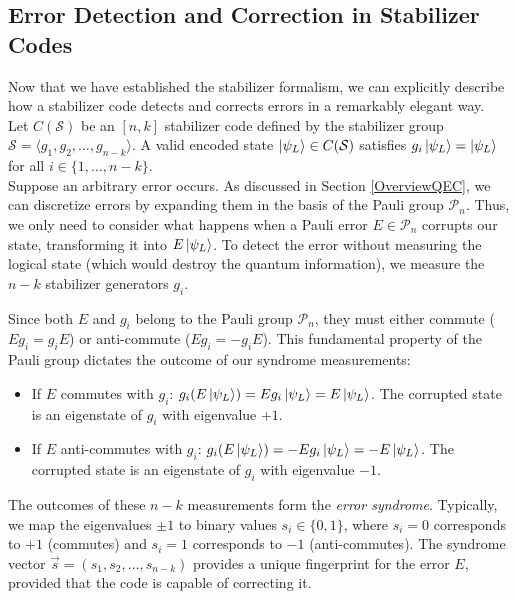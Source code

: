 \documentclass[12pt, twoside, openany]{book}
\begin{document}
\subsection{Error Detection and Correction in Stabilizer Codes}

Now that we have established the stabilizer formalism, we can explicitly describe how a stabilizer code detects and corrects errors in a remarkably elegant way. \cite{Gottesman1997}\\

Let $C(\mathcal{S})$ be an $[n, k]$ stabilizer code defined by the stabilizer group $\mathcal{S} = \langle g_1, g_2, \ldots, g_{n-k} \rangle$. A valid encoded state $\ket{\psi_L} \in C(\mathcal{S})$ satisfies $g_i \ket{\psi_L} = \ket{\psi_L}$ for all $i \in \{1, \dots, n-k\}$. \\

Suppose an arbitrary error occurs. As discussed in Section \ref{OverviewQEC}, we can discretize errors by expanding them in the basis of the Pauli group $\mathcal{P}_n$. Thus, we only need to consider what happens when a Pauli error $E \in \mathcal{P}_n$ corrupts our state, transforming it into $E \ket{\psi_L}$. To detect the error without measuring the logical state (which would destroy the quantum information), we measure the $n-k$ stabilizer generators $g_i$. 

Since both $E$ and $g_i$ belong to the Pauli group $\mathcal{P}_n$, they must either commute ($E g_i = g_i E$) or anti-commute ($E g_i = -g_i E$). This fundamental property of the Pauli group dictates the outcome of our syndrome measurements: 

\begin{itemize}
    \item If $E$ commutes with $g_i$: $g_i (E \ket{\psi_L}) = E g_i \ket{\psi_L} = E \ket{\psi_L}$. The corrupted state is an eigenstate of $g_i$ with eigenvalue $+1$.
    \item If $E$ anti-commutes with $g_i$: $g_i (E \ket{\psi_L}) = -E g_i \ket{\psi_L} = -E \ket{\psi_L}$. The corrupted state is an eigenstate of $g_i$ with eigenvalue $-1$.
\end{itemize}

The outcomes of these $n-k$ measurements form the \textit{error syndrome}. Typically, we map the eigenvalues $\pm 1$ to binary values $s_i \in \{0, 1\}$, where $s_i = 0$ corresponds to $+1$ (commutes) and $s_i = 1$ corresponds to $-1$ (anti-commutes). The syndrome vector $\vec{s} = (s_1, s_2, \ldots, s_{n-k})$ provides a unique fingerprint for the error $E$, provided that the code is capable of correcting it. 
\end{document}
